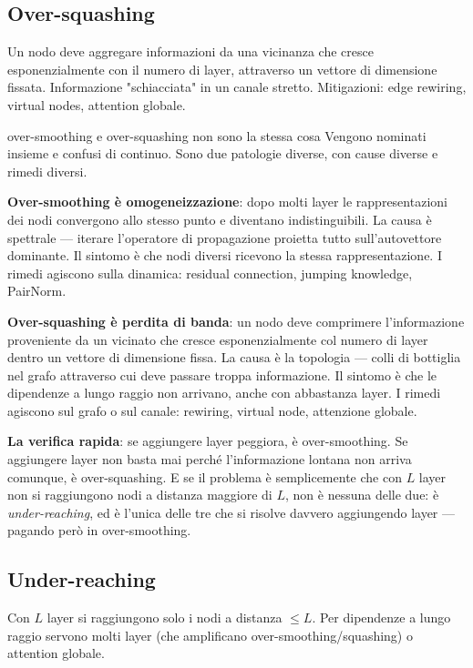 \subsection{Over-squashing}
Un nodo deve aggregare informazioni da una vicinanza che cresce esponenzialmente con il numero di layer, attraverso un vettore di dimensione fissata. Informazione "schiacciata" in un canale stretto. Mitigazioni: edge rewiring, virtual nodes, attention globale.

\begin{trappola}{over-smoothing e over-squashing non sono la stessa cosa}
Vengono nominati insieme e confusi di continuo. Sono due patologie diverse, con cause diverse e rimedi diversi.

\textbf{Over-smoothing è omogeneizzazione}: dopo molti layer le rappresentazioni dei nodi convergono allo stesso punto e diventano indistinguibili. La causa è spettrale — iterare l'operatore di propagazione proietta tutto sull'autovettore dominante. Il sintomo è che nodi diversi ricevono la stessa rappresentazione. I rimedi agiscono sulla dinamica: residual connection, jumping knowledge, PairNorm.

\textbf{Over-squashing è perdita di banda}: un nodo deve comprimere l'informazione proveniente da un vicinato che cresce esponenzialmente col numero di layer dentro un vettore di dimensione fissa. La causa è la topologia — colli di bottiglia nel grafo attraverso cui deve passare troppa informazione. Il sintomo è che le dipendenze a lungo raggio non arrivano, anche con abbastanza layer. I rimedi agiscono sul grafo o sul canale: rewiring, virtual node, attenzione globale.

\textbf{La verifica rapida}: se aggiungere layer peggiora, è over-smoothing. Se aggiungere layer non basta mai perché l'informazione lontana non arriva comunque, è over-squashing. E se il problema è semplicemente che con $L$ layer non si raggiungono nodi a distanza maggiore di $L$, non è nessuna delle due: è \emph{under-reaching}, ed è l'unica delle tre che si risolve davvero aggiungendo layer — pagando però in over-smoothing.
\end{trappola}

\subsection{Under-reaching}
Con $L$ layer si raggiungono solo i nodi a distanza $\leq L$. Per dipendenze a lungo raggio servono molti layer (che amplificano over-smoothing/squashing) o attention globale.

